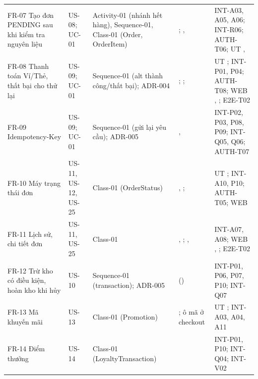 {\begin{longtable}{@{}L{2.4cm}L{2cm}L{2.6cm}L{3.6cm}L{3.3cm}@{}}
FR-07 Tạo đơn PENDING sau khi kiểm tra nguyên liệu & US-08; UC-01 & Activity-01 (nhánh hết hàng), Sequence-01, Class-01 (Order, OrderItem) & ; ,  & INT-A03, A05, A06; INT-R06; AUTH-T06; UT ,  \\
FR-08 Thanh toán Ví/Thẻ, thất bại cho thử lại & US-09; UC-01 & Sequence-01 (alt thành công/thất bại); ADR-004 & ; ;  & UT ; INT-P01, P04; AUTH-T08; WEB , ; E2E-T02 \\
FR-09 Idempotency-Key & US-09; UC-01 & Sequence-01 (gửi lại yêu cầu); ADR-005 & ,  & INT-P02, P03, P08, P09; INT-Q05, Q06; AUTH-T07 \\
FR-10 Máy trạng thái đơn & US-11, US-12, US-25 & Class-01 (OrderStatus) & , ;  & UT ; INT-A10, P10; AUTH-T05; WEB  \\
FR-11 Lịch sử, chi tiết đơn & US-11, US-25 & Class-01 & , ; ,  & INT-A07, A08; WEB , ; E2E-T02 \\
FR-12 Trừ kho có điều kiện, hoàn kho khi hủy & US-10 & Sequence-01 (transaction); ADR-005 &  () & INT-P01, P06, P07, P10; INT-Q07 \\
FR-13 Mã khuyến mãi & US-13 & Class-01 (Promotion) & ; ô mã ở checkout & UT ; INT-A03, A04, A11 \\
FR-14 Điểm thưởng & US-14 & Class-01 (LoyaltyTransaction) &  & INT-P01, P10; INT-Q04; INT-V02 \\

\end{longtable}}
